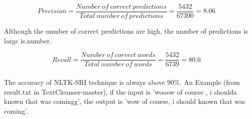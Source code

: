 \begin{equation}
\label{eq:prec}
Precision = \frac{\mathit{Number\ of\ correct\ predictions}}{\mathit{Total\ number\ of\ predictions}} = \frac{\mathit{5432}}{\mathit{67390}} ={{8.06}}
\end{equation}


Although the number of correct predictions are high, the number of predictions is large is.number. 

\begin{equation}
\label{eq:recc}
Recall = \frac{\mathit{Number\ of\ correct\ words}}{\mathit{Total\ number\ of\ words}} = \frac{\mathit{5432}}{\mathit{6739}} ={{80.6}}
\end{equation}
\\
The accuracy of NLTK-SRI technique is always above {90\%}.
An Example (from result.txt in TextCleanser-master), if the input is 'wooow of course , i shoulda known that was comingg', the output is 'wow of course, i should known that was coming'.   





